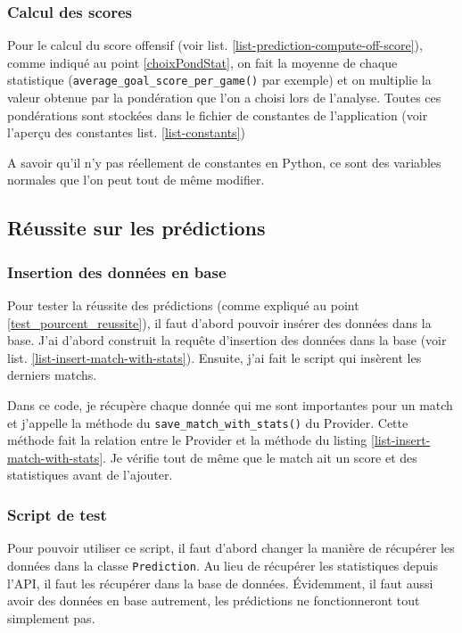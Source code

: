 \documentclass[a4paper,14pt]{extarticle}
\begin{document}
{

\subsubsection{Calcul des scores}

Pour le calcul du score offensif (voir list. \ref{list-prediction-compute-off-score}), comme indiqué au point \ref{choixPondStat}, on fait la moyenne de chaque statistique (\texttt{average\_goal\_score\_per\_game()} par exemple) et on multiplie la valeur obtenue par la pondération que l'on a choisi lors de l'analyse. Toutes ces pondérations sont stockées dans le fichier de constantes de l'application (voir l'aperçu des constantes list. \ref{list-constants})

A savoir qu'il n'y pas réellement de constantes en Python, ce sont des variables normales que l'on peut tout de même modifier.

\subsection{Réussite sur les prédictions}

\subsubsection{Insertion des données en base}

Pour tester la réussite des prédictions (comme expliqué au point \ref{test_pourcent_reussite}), il faut d'abord pouvoir insérer des données dans la base. J'ai d'abord construit la requête d'insertion des données dans la base (voir list. \ref{list-insert-match-with-stats}). Ensuite, j'ai fait le script qui insèrent les derniers matchs.


Dans ce code, je récupère chaque donnée qui me sont importantes pour un match et j'appelle la méthode du \texttt{save\_match\_with\_stats()} du Provider. Cette méthode fait la relation entre le Provider et la méthode du listing \ref{list-insert-match-with-stats}. Je vérifie tout de même que le match ait un score et des statistiques avant de l'ajouter.

\subsubsection{Script de test}
Pour pouvoir utiliser ce script, il faut d'abord changer la manière de récupérer les données dans la classe \texttt{Prediction}. Au lieu de récupérer les statistiques depuis l'API, il faut les récupérer dans la base de données. Évidemment, il faut aussi avoir des données en base autrement, les prédictions ne fonctionneront tout simplement pas.

}
\end{document}
